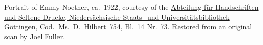 Portrait of Emmy Noether, ca.~1922, courtesy of
the \href{http://www.sub.uni-goettingen.de/en/contact/departments-a-z/departmental-and-unit-details/abteilunggruppe/handschriften-und-seltene-drucke/}{Abteilung
f\"ur Handschriften und Seltene Drucke, Nieders\"achsische Staats- und
Universit\"atsbibliothek G\"ottingen}, Cod.\ Ms.\ D.~Hilbert~754,
Bl.~14 Nr.~73. Restored from an original scan by Joel Fuller.
